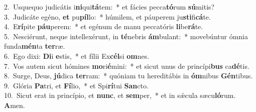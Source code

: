 {2.~}Usquequo judicátis i\textbf{ni}qui\textbf{tá}tem:~* et fácies pecca\textbf{tó}rum \textbf{sú}mitis?\\
{3.~}Judicáte egéno, \textbf{et} pu\textbf{píl}lo:~* húmilem, et páuperem ju\textbf{sti}fi\textbf{cá}te.\\
{4.~}E\textbf{rí}pite \textbf{páu}perem:~* et egénum de manu peccatóris \textbf{li}be\textbf{rá}te.\\
{5.~}Nesciérunt, neque intellexérunt, in \textbf{té}nebris \textbf{ám}bulant:~* movebúntur ómnia funda\textbf{mén}ta \textbf{ter}ræ.\\
{6.~}Ego dixi: \textbf{Di}i \textbf{e}stis,~* et fílii Ex\textbf{cél}si \textbf{om}nes.\\
{7.~}Vos autem sicut hómines \textbf{mo}ri\textbf{é}mini:~* et sicut unus de princípi\textbf{bus} ca\textbf{dé}tis.\\
{8.~}Surge, Deus, \textbf{jú}dica \textbf{ter}ram:~* quóniam tu hereditábis in \textbf{óm}nibus \textbf{Gén}tibus.\\
{9.~}Glória \textbf{Pa}tri, et \textbf{Fí}lio,~* et Spi\textbf{rí}tui \textbf{San}cto.\\
{10.~}Sicut erat in princípio, et \textbf{nunc}, et \textbf{sem}per,~* et in sǽcula sæcu\textbf{ló}rum. \textbf{A}men.\\
